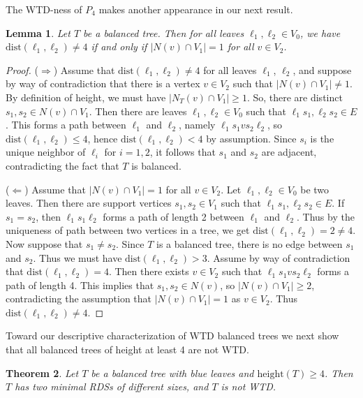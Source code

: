 \documentclass[12pt, reqno]{amsart}
\theoremstyle{definition}
\theoremstyle{plain}
\newtheorem{theorem}{Theorem}[section]
\newtheorem{lemma}[theorem]{Lemma}
\theoremstyle{definition}
\newcommand{\dist}{\text{dist}}
\newcommand{\hh}{\mbox{height}}
\begin{document}
The WTD-ness of $P_4$ makes another appearance in our next result.

\begin{lemma}\label{lem. no 4-path iff |N(v) cap V_1| = 1}
    Let $T$ be a balanced tree.
    Then for all leaves $\ell_1,\ell_2 \in V_0$, we have $\dist(\ell_1,\ell_2) \neq 4$ if and only if $|N(v) \cap V_1| = 1$ for all $v \in V_2$.
\end{lemma}

\begin{proof}
    ($\Rightarrow$) Assume that $\dist(\ell_1,\ell_2) \neq 4$ for all leaves $\ell_1$, $\ell_2$, and suppose by way of contradiction that there is a vertex $v \in V_2$ such that $|N(v) \cap V_1| \neq 1$.
    By definition of height, we must have $|N_T(v) \cap V_1| \geq 1$.
    So, there are distinct $s_1,s_2 \in N(v) \cap V_1$.
    Then there are leaves $\ell_1,\ell_2 \in V_0$ such that $\ell_1s_1,\ell_2s_2 \in E$.
    This forms a path between $\ell_1$ and $\ell_2$, namely $\ell_1s_1vs_2\ell_2$, so $\dist(\ell_1,\ell_2) \leq 4$, hence $\dist(\ell_1,\ell_2) < 4$ by assumption.
    Since $s_i$ is the unique neighbor of $\ell_i$ for $i = 1,2$, it follows that $s_1$ and $s_2$ are adjacent, contradicting the fact that $T$ is balanced.

    ($\Leftarrow$) Assume that $|N(v) \cap V_1| = 1$ for all $v \in V_2$. 
    Let $\ell_1,\ell_2 \in V_0$ be two leaves.
    Then there are support vertices $s_1,s_2 \in V_1$ such that $\ell_1s_1,\ell_2s_2 \in E$.
    If $s_1 = s_2$, then $\ell_1 s_1\ell_2$ forms a path of length 2 between $\ell_1$ and $\ell_2$.
    Thus by the uniqueness of path between two vertices in a tree, we get $\dist(\ell_1,\ell_2) = 2 \neq 4$.
    Now suppose that $s_1 \neq s_2$.
    Since $T$ is a balanced tree, there is no edge between $s_1$ and $s_2$.
    Thus we must have $\dist(\ell_1, \ell_2) > 3$.
    Assume by way of contradiction that $\dist(\ell_1,\ell_2) = 4$. 
    Then there exists $v \in V_2$ such that $\ell_1 s_1 v s_2 \ell_2$ forms a path of length 4.
    This implies that $s_1,s_2 \in N(v)$, so $|N(v) \cap V_1| \geq 2$, contradicting the assumption that $|N(v) \cap V_1| = 1$ as $v \in V_2$.
    Thus $\dist(\ell_1,\ell_2) \neq 4$.
\end{proof}

Toward our descriptive characterization of WTD balanced trees we next show that all balanced trees of height at least 4 are not WTD.

\begin{theorem}
\label{thm. height >= 4 is not WTD}
Let $T$ be a balanced tree with blue leaves and $\hh(T) \geq 4$. 
Then $T$ has two minimal RDSs of different sizes, and $T$ is not WTD.
\end{theorem}
\end{document}
